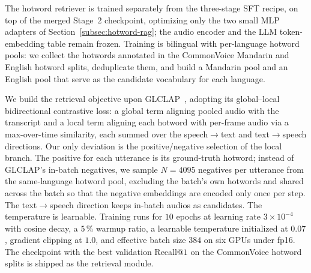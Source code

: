The hotword retriever is trained separately from the three-stage SFT
recipe, on top of the merged Stage~2 checkpoint, optimizing only the
two small MLP adapters of Section~\ref{subsec:hotword-rag}; the audio
encoder and the LLM token-embedding table remain frozen. Training is
bilingual with per-language hotword pools: we collect the hotwords
annotated in the CommonVoice Mandarin and English hotword splits,
deduplicate them, and build a Mandarin pool and an English pool that
serve as the candidate vocabulary for each language.

We build the retrieval objective upon
GLCLAP~\cite{kong2025glclap}, adopting its global--local bidirectional
contrastive loss: a global term aligning pooled audio with the
transcript and a local term aligning each hotword with per-frame audio
via a max-over-time similarity, each summed over the
speech$\to$text and text$\to$speech directions. Our only deviation is
the positive/negative selection of the local branch. The positive for
each utterance is its ground-truth hotword; instead of GLCLAP's
in-batch negatives, we sample $N{=}4095$ negatives per utterance from the
same-language hotword pool, excluding the batch's own hotwords and
shared across the batch so that the negative embeddings are encoded
only once per step. The text$\to$speech direction keeps in-batch audios
as candidates. The temperature is learnable.
Training runs for $10$ epochs at learning rate $3\!\times\!10^{-4}$
with cosine decay, a $5$\,\% warmup ratio, a learnable temperature
initialized at $0.07$, gradient clipping at $1.0$, and effective batch
size $384$ on six GPUs under fp16. The checkpoint with the best
validation Recall@$1$ on the CommonVoice hotword splits is shipped as
the retrieval module.
